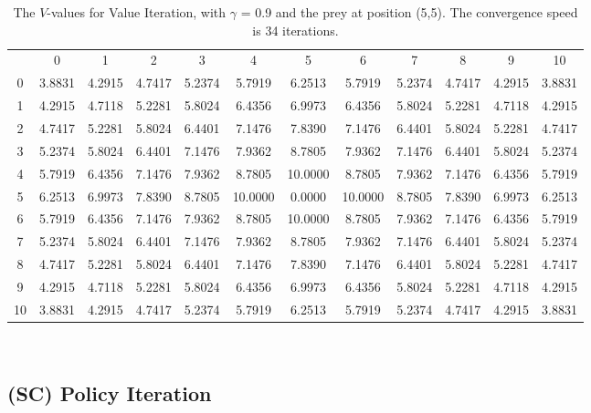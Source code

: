 \documentclass{article}
\begin{document}
\begin{landscape}
\begin{table}[tbp]
\centering
\begin{tabular} {c c c c c c c c c c c c}
 & 0 & 1 & 2 & 3 & 4 & 5 & 6 & 7 & 8 & 9 & 10 \\
0 &  3.8831 &  4.2915 &  4.7417 &  5.2374 &  5.7919 &  6.2513 &  5.7919 &  5.2374 &  4.7417 &  4.2915 &  3.8831\\
1 &  4.2915 &  4.7118 &  5.2281 &  5.8024 &  6.4356 &  6.9973 &  6.4356 &  5.8024 &  5.2281 &  4.7118 &  4.2915\\
2 &  4.7417 &  5.2281 &  5.8024 &  6.4401 &  7.1476 &  7.8390 &  7.1476 &  6.4401 &  5.8024 &  5.2281 &  4.7417\\
3 &  5.2374 &  5.8024 &  6.4401 &  7.1476 &  7.9362 &  8.7805 &  7.9362 &  7.1476 &  6.4401 &  5.8024 &  5.2374\\
4 &  5.7919 &  6.4356 &  7.1476 &  7.9362 &  8.7805 & 10.0000 &  8.7805 &  7.9362 &  7.1476 &  6.4356 &  5.7919\\
5 &  6.2513 &  6.9973 &  7.8390 &  8.7805 & 10.0000 &  0.0000 & 10.0000 &  8.7805 &  7.8390 &  6.9973 &  6.2513\\
6 &  5.7919 &  6.4356 &  7.1476 &  7.9362 &  8.7805 & 10.0000 &  8.7805 &  7.9362 &  7.1476 &  6.4356 &  5.7919\\
7 &  5.2374 &  5.8024 &  6.4401 &  7.1476 &  7.9362 &  8.7805 &  7.9362 &  7.1476 &  6.4401 &  5.8024 &  5.2374\\
8 &  4.7417 &  5.2281 &  5.8024 &  6.4401 &  7.1476 &  7.8390 &  7.1476 &  6.4401 &  5.8024 &  5.2281 &  4.7417\\
9 &  4.2915 &  4.7118 &  5.2281 &  5.8024 &  6.4356 &  6.9973 &  6.4356 &  5.8024 &  5.2281 &  4.7118 &  4.2915\\
10 &  3.8831 &  4.2915 &  4.7417 &  5.2374 &  5.7919 &  6.2513 &  5.7919 &  5.2374 &  4.7417 &  4.2915 &  3.8831\\\end{tabular}\\
\caption{The $V$-values for Value Iteration, with $\gamma$ = 0.9 and the prey at position (5,5). The convergence speed is 34 iterations.}
\label{valueiteration4}
\end{table}


\end{landscape}
\newpage


\subsection{(SC) Policy Iteration}
\end{document}
